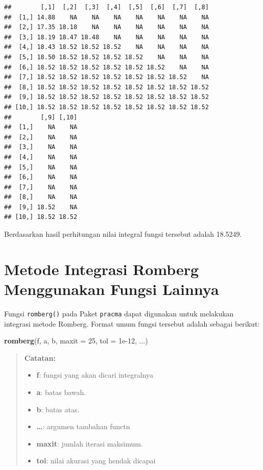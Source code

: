 \documentclass[]{book}
\newenvironment{Shaded}{\begin{snugshade}}{\end{snugshade}}
\newcommand{\DataTypeTok}[1]{\textcolor[rgb]{0.13,0.29,0.53}{#1}}
\newcommand{\DecValTok}[1]{\textcolor[rgb]{0.00,0.00,0.81}{#1}}
\newcommand{\FloatTok}[1]{\textcolor[rgb]{0.00,0.00,0.81}{#1}}
\newcommand{\KeywordTok}[1]{\textcolor[rgb]{0.13,0.29,0.53}{\textbf{#1}}}
\newcommand{\NormalTok}[1]{#1}
\providecommand{\tightlist}{%
  \setlength{\itemsep}{0pt}\setlength{\parskip}{0pt}}
\theoremstyle{definition}
\theoremstyle{definition}
\theoremstyle{definition}
\theoremstyle{remark}
\begin{document}
\begin{verbatim}
##        [,1]  [,2]  [,3]  [,4]  [,5]  [,6]  [,7]  [,8]
##  [1,] 14.88    NA    NA    NA    NA    NA    NA    NA
##  [2,] 17.35 18.18    NA    NA    NA    NA    NA    NA
##  [3,] 18.19 18.47 18.48    NA    NA    NA    NA    NA
##  [4,] 18.43 18.52 18.52 18.52    NA    NA    NA    NA
##  [5,] 18.50 18.52 18.52 18.52 18.52    NA    NA    NA
##  [6,] 18.52 18.52 18.52 18.52 18.52 18.52    NA    NA
##  [7,] 18.52 18.52 18.52 18.52 18.52 18.52 18.52    NA
##  [8,] 18.52 18.52 18.52 18.52 18.52 18.52 18.52 18.52
##  [9,] 18.52 18.52 18.52 18.52 18.52 18.52 18.52 18.52
## [10,] 18.52 18.52 18.52 18.52 18.52 18.52 18.52 18.52
##        [,9] [,10]
##  [1,]    NA    NA
##  [2,]    NA    NA
##  [3,]    NA    NA
##  [4,]    NA    NA
##  [5,]    NA    NA
##  [6,]    NA    NA
##  [7,]    NA    NA
##  [8,]    NA    NA
##  [9,] 18.52    NA
## [10,] 18.52 18.52
\end{verbatim}

Berdasarkan hasil perhitungan nilai integral fungsi tersebut adalah 18.5249.

\hypertarget{metode-integrasi-romberg-menggunakan-fungsi-lainnya}{%
\section{Metode Integrasi Romberg Menggunakan Fungsi Lainnya}\label{metode-integrasi-romberg-menggunakan-fungsi-lainnya}}

Fungsi \texttt{romberg()} pada Paket \texttt{pracma} dapat digunakan untuk melakukan integrasi metode Romberg. Format umum fungsi tersebut adalah sebagai berikut:

\begin{Shaded}
\begin{Highlighting}[]
\KeywordTok{romberg}\NormalTok{(f, a, b, }\DataTypeTok{maxit =} \DecValTok{25}\NormalTok{, }\DataTypeTok{tol =} \FloatTok{1e-12}\NormalTok{, ...)}
\end{Highlighting}
\end{Shaded}

\begin{quote}
\textbf{Catatan:}

\begin{itemize}
\tightlist
\item
  \textbf{f}: fungsi yang akan dicari integralnya
\item
  \textbf{a}: batas bawah.
\item
  \textbf{b}: batas atas.
\item
  \textbf{\ldots{}}: argumen tambahan functn
\item
  \textbf{maxit}: jumlah iterasi maksimum.
\item
  \textbf{tol}: nilai akurasi yang hendak dicapai
\end{itemize}
\end{quote}
\end{document}
